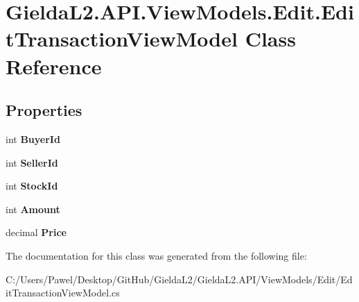 \hypertarget{class_gielda_l2_1_1_a_p_i_1_1_view_models_1_1_edit_1_1_edit_transaction_view_model}{}\section{Gielda\+L2.\+A\+P\+I.\+View\+Models.\+Edit.\+Edit\+Transaction\+View\+Model Class Reference}
\label{class_gielda_l2_1_1_a_p_i_1_1_view_models_1_1_edit_1_1_edit_transaction_view_model}
\subsection*{Properties}
\begin{DoxyCompactItemize}
\item 
\mbox{\label{class_gielda_l2_1_1_a_p_i_1_1_view_models_1_1_edit_1_1_edit_transaction_view_model_afd4891d3e034df892ca9b2ae1d6d6ae6}} 
int {\bfseries Buyer\+Id}
\item 
\mbox{\label{class_gielda_l2_1_1_a_p_i_1_1_view_models_1_1_edit_1_1_edit_transaction_view_model_a12d1a9452607f89f3192eeb4061d3571}} 
int {\bfseries Seller\+Id}
\item 
\mbox{\label{class_gielda_l2_1_1_a_p_i_1_1_view_models_1_1_edit_1_1_edit_transaction_view_model_a05599da5b4e51eb02c3954ee13adc6f9}} 
int {\bfseries Stock\+Id}
\item 
\mbox{\label{class_gielda_l2_1_1_a_p_i_1_1_view_models_1_1_edit_1_1_edit_transaction_view_model_a245082b7f5fcded9156d0e0a43d3b3e8}} 
int {\bfseries Amount}
\item 
\mbox{\label{class_gielda_l2_1_1_a_p_i_1_1_view_models_1_1_edit_1_1_edit_transaction_view_model_a857f5a8344e31733a7bf83982195a6be}} 
decimal {\bfseries Price}
\end{DoxyCompactItemize}


The documentation for this class was generated from the following file\+:\begin{DoxyCompactItemize}
\item 
C\+:/\+Users/\+Pawel/\+Desktop/\+Git\+Hub/\+Gielda\+L2/\+Gielda\+L2.\+A\+P\+I/\+View\+Models/\+Edit/Edit\+Transaction\+View\+Model.\+cs\end{DoxyCompactItemize}
